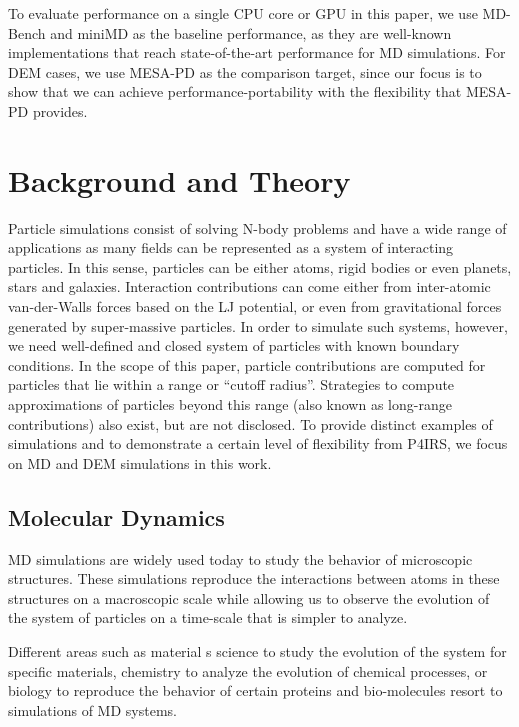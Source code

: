 \documentclass[Afour,sageh,times]{sagej}
\newcommand{\RMchange}[1]{{\color{blue} #1}}
\begin{document}
To evaluate performance on a single CPU core or GPU in this paper, we use MD-Bench and miniMD as the baseline performance, as they are well-known implementations that reach state-of-the-art performance for MD simulations.
For DEM cases, we use MESA-PD as the comparison target, since our focus is to show that we can achieve performance-portability with the flexibility that MESA-PD provides. 

\section{Background and Theory}
\label{sec:background}

Particle simulations consist of solving N-body problems and have a wide range of applications as many fields can be represented as a system of interacting particles.
In this sense, particles can be either atoms, rigid bodies or even planets, stars and galaxies.
Interaction contributions can come either from inter-atomic van-der-Walls forces based on the \ac{LJ} potential, or even from gravitational forces generated by super-massive particles.
In order to simulate such systems, however, we need well-defined and closed system of particles with known boundary conditions.
In the scope of this paper, particle contributions are computed for particles that lie within a range or ``cutoff radius''. 
Strategies to compute approximations \RMchange{of} particles beyond this range (also known as long-range contributions) also exist, but are not disclosed.
To provide distinct examples of simulations and \RMchange{to} demonstrate a certain level of flexibility from P4IRS, we focus on MD and DEM simulations in this work.

\subsection{Molecular Dynamics}
\label{sec:md}

\ac{MD} simulations are widely used today to study the behavior of microscopic structures.
These simulations reproduce the interactions \RMchange{between} atoms in these structures on a macroscopic scale while allowing us to observe the evolution \RMchange{of} the system of particles \RMchange{on} a time-scale that is simpler to analyze.

Different areas such as material\RMchange{s} science to study the evolution of the system for specific materials, chemistry to analyze the evolution of chemical processes, or biology to reproduce the behavior of certain proteins and bio-molecules resort to simulations of \ac{MD} systems.
\end{document}
